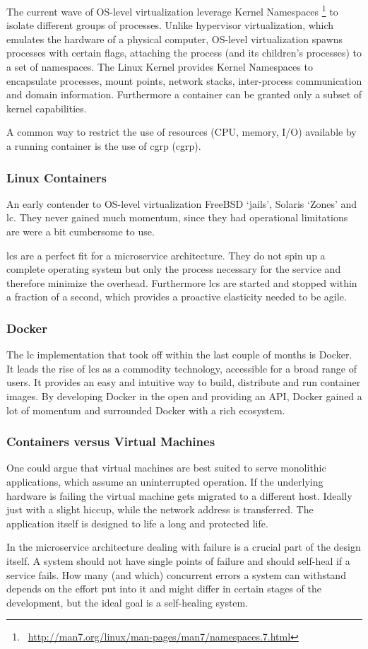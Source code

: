 The current wave of OS-level virtualization leverage Kernel Namespaces \footnote{\Mundus~\url{http://man7.org/linux/man-pages/man7/namespaces.7.html}} to isolate different groups of processes. Unlike hypervisor virtualization, which emulates
the hardware of a physical computer, OS-level virtualization spawns processes with certain flags, attaching the process (and its children's processes)
to a set of namespaces. The Linux Kernel provides Kernel Namespaces to encapsulate processes, mount points, network stacks,
inter-process communication and domain information. Furthermore a container can be granted only a subset of kernel capabilities.

A common way to restrict the use of resources (CPU, memory, I/O) available by a running container is the use of \gls{cgrp} (\glsdesc{cgrp}).

\subsubsection{Linux Containers}
An early contender to OS-level virtualization FreeBSD `jails', Solaris `Zones' and \gls{lc}. They never gained much momentum, since they had operational limitations are were a bit cumbersome to use.

\glspl{lc} are a perfect fit for a microservice architecture. They do not spin up a complete operating system but only the process
necessary for the service and therefore minimize the overhead. Furthermore \glspl{lc} are started and stopped within a
fraction of a second, which provides a proactive elasticity needed to be agile.

\subsubsection{Docker}
The \gls{lc} implementation that took off within the last couple of months is Docker. It leads the rise of \glspl{lc} as a commodity technology, accessible
for a broad range of users. It provides an easy and intuitive way to build, distribute and run container images.
By developing Docker in the open and providing an API, Docker gained a lot of momentum and surrounded Docker with a rich ecosystem.

\subsubsection{Containers versus Virtual Machines}
One could argue that virtual machines are best suited to serve monolithic applications,
which assume an uninterrupted operation. If the underlying hardware is failing the virtual machine gets migrated to a different host. Ideally just
with a slight hiccup, while the network address is transferred. The application itself is designed to life a long and protected life.

In the microservice architecture dealing with failure is a crucial part of the design itself. A system should not have single points of failure and
should self-heal if a service fails. How many (and which) concurrent errors a system can withstand depends on the effort put into it and might differ
in certain stages of the development, but the ideal goal is a self-healing system.


